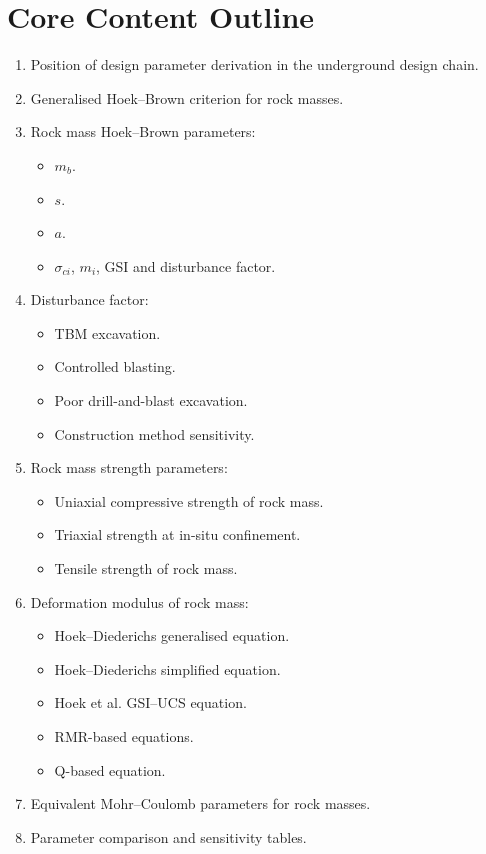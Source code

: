 \documentclass[12pt,oneside]{book}
\begin{document}
\section{Core Content Outline}
\begin{enumerate}
    \item Position of design parameter derivation in the underground design chain.
    \item Generalised Hoek--Brown criterion for rock masses.
    \item Rock mass Hoek--Brown parameters:
    \begin{itemize}
        \item \(m_b\).
        \item \(s\).
        \item \(a\).
        \item \(\sigma_{ci}\), \(m_i\), GSI and disturbance factor.
    \end{itemize}
    \item Disturbance factor:
    \begin{itemize}
        \item TBM excavation.
        \item Controlled blasting.
        \item Poor drill-and-blast excavation.
        \item Construction method sensitivity.
    \end{itemize}
    \item Rock mass strength parameters:
    \begin{itemize}
        \item Uniaxial compressive strength of rock mass.
        \item Triaxial strength at in-situ confinement.
        \item Tensile strength of rock mass.
    \end{itemize}
    \item Deformation modulus of rock mass:
    \begin{itemize}
        \item Hoek--Diederichs generalised equation.
        \item Hoek--Diederichs simplified equation.
        \item Hoek et al. GSI--UCS equation.
        \item RMR-based equations.
        \item Q-based equation.
    \end{itemize}
    \item Equivalent Mohr--Coulomb parameters for rock masses.
    \item Parameter comparison and sensitivity tables.
\end{enumerate}
\end{document}
